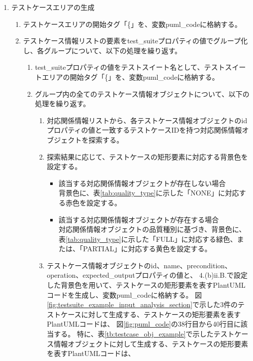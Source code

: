 \begin{enumerate}
    \item テストケースエリアの生成
    \begin{enumerate}
        \item テストケースエリアの開始タグ「\{」を、変数puml\_codeに格納する。
        \item テストケース情報リストの要素をtest\_suiteプロパティの値でグループ化し、各グループについて、以下の処理を繰り返す。
        \begin{enumerate}
            \item test\_suiteプロパティの値をテストスイート名として、テストスイートエリアの開始タグ「\{」を、変数puml\_codeに格納する。
            \item グループ内の全てのテストケース情報オブジェクトについて、以下の処理を繰り返す。
            \begin{enumerate}
                \item 対応関係情報リストから、各テストケース情報オブジェクトのidプロパティの値と一致するテストケースIDを持つ対応関係情報オブジェクトを探索する。
                \item 探索結果に応じて、テストケースの矩形要素に対応する背景色を設定する。
                \begin{itemize}
                    \item 該当する対応関係情報オブジェクトが存在しない場合\\
                    背景色に、表\ref{tab:quality_type}に示した「NONE」に対応する赤色を設定する。
                    \item 該当する対応関係情報オブジェクトが存在する場合\\
                    対応関係情報オブジェクトの品質種別に基づき、背景色に、表\ref{tab:quality_type}に示した「FULL」に対応する緑色、または、「PARTIAL」に対応する黄色を設定する。
                \end{itemize}
                \item テストケース情報オブジェクトのid、name、precondition、operation、expected\_outputプロパティの値と、
                $4$.(b)ii.B.で設定した背景色を用いて、テストケースの矩形要素を表すPlantUMLコードを生成し、変数puml\_codeに格納する。
                図\ref{fig:testsuite_example_input_analysis_section}で示した3件のテストケースに対して生成する、テストケースの矩形要素を表すPlantUMLコードは、
                図\ref{fig:puml_code}の38行目から40行目に該当する。
                特に、表\ref{tb:testcase_obj_example}で示したテストケース情報オブジェクトに対して生成する、テストケースの矩形要素を表すPlantUMLコードは、

\end{enumerate}
\end{enumerate}
\end{enumerate}
\end{enumerate}
